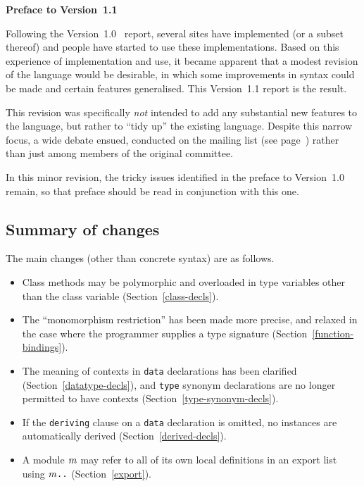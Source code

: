 %
%
\begin{center}
\Large\bf Preface to Version~1.1
\end{center}

\vspace{.2in}

\noindent
Following the Version~1.0 \Haskell{}~report, several sites have
implemented \Haskell{} (or a subset thereof) and people have started
to use these implementations.  Based on this experience of
implementation and use, it became apparent that a modest revision of
the language would be desirable, in which some improvements in syntax
could be made and certain features generalised.  This Version~1.1
report is the result.

This revision was specifically {\em not} intended to add any
substantial new features to the language, but rather to ``tidy up''
the existing language.  Despite this narrow focus, a wide
debate ensued, conducted on the \Haskell{} mailing list
(see page~\pageref{haskell-mailing-list}) rather than just among members of
the original committee.

In this minor revision, the tricky issues identified in the preface to
Version~1.0 remain, so that preface should be read in conjunction with
this one.

\subsection*{Summary of changes}
\label{preface-changes-11}

The main changes (other than concrete syntax) are as follows.

\begin{itemize}
\item
Class methods
may be polymorphic and overloaded in type variables
other than the class variable (Section~\ref{class-decls}).

\item
The ``monomorphism restriction''
has been made more precise, and
relaxed in the case where the programmer supplies a type signature
(Section~\ref{function-bindings}).

\item
The meaning of contexts in \mbox{\tt data} declarations has been clarified
(Section~\ref{datatype-decls}), and \mbox{\tt type} synonym declarations are no
longer permitted to have contexts (Section~\ref{type-synonym-decls}).

\item
If the \mbox{\tt deriving} clause on a \mbox{\tt data} declaration is omitted, no
instances are automatically derived (Section~\ref{derived-decls}).

\item
A module \mbox{$\it m$} may refer to all of its own local definitions in an export
list using \mbox{$\it m\makebox{\tt ..}$} (Section~\ref{export}).
\end{itemize}

